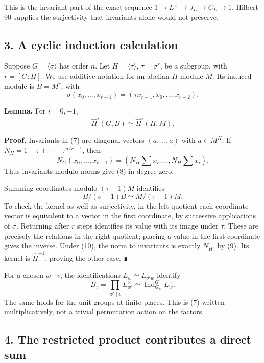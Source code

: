 \documentclass[11pt,a4paper]{article}
\begin{document}
This is the invariant part of the exact sequence
\(1\to L^\times\to J_L\to C_L\to1\). Hilbert 90 supplies the
surjectivity that invariants alone would not preserve.

\subsection{3. A cyclic induction
calculation}\label{a-cyclic-induction-calculation}

Suppose \(G=\langle\sigma\rangle\) has order \(n\). Let
\(H=\langle\tau\rangle\), \(\tau=\sigma^r\), be a subgroup, with
\(r=[G:H]\). We use additive notation for an abelian \(H\)-module \(M\).
Its induced module is \(B=M^r\), with \[
\sigma(x_0,\ldots,x_{r-1})=(\tau x_{r-1},x_0,\ldots,x_{r-2}).
\tag{7}
\]

\textbf{Lemma.} For \(i=0,-1\), \[
\widehat H^i(G,B)\simeq\widehat H^i(H,M).
\tag{8}
\]

\textbf{Proof.} Invariants in (7) are diagonal vectors \((a,\ldots,a)\)
with \(a\in M^H\). If \(N_H=1+\tau+\cdots+\tau^{n/r-1}\), then \[
N_G(x_0,\ldots,x_{r-1})
=(N_H\textstyle\sum x_i,\ldots,N_H\sum x_i).
\tag{9}
\] Thus invariants modulo norms give (8) in degree zero.

Summing coordinates modulo \((\tau-1)M\) identifies \[
B/(\sigma-1)B\simeq M/(\tau-1)M.
\tag{10}
\] To check the kernel as well as surjectivity, in the left quotient
each coordinate vector is equivalent to a vector in the first
coordinate, by successive applications of \(\sigma\). Returning after
\(r\) steps identifies its value with its image under \(\tau\). These
are precisely the relations in the right quotient; placing a value in
the first coordinate gives the inverse. Under (10), the norm to
invariants is exactly \(N_H\), by (9). Its kernel is
\(\widehat H^{-1}\), proving the other case. ∎

For a chosen \(w\mid v\), the identifications
\(L_w\simeq L_{\sigma^i w}\) identify \[
B_v=\prod_{w'\mid v}L_{w'}^\times
 \simeq\operatorname{Ind}_{G_w}^G L_w^\times.
\tag{11}
\] The same holds for the unit groups at finite places. This is (7)
written multiplicatively, not a trivial permutation action on the
factors.

\subsection{4. The restricted product contributes a direct
sum}\label{the-restricted-product-contributes-a-direct-sum}
\end{document}

